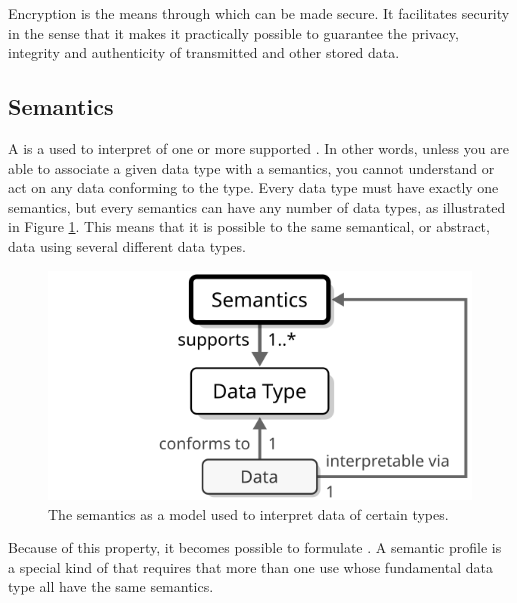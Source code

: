 Encryption is the means through which  can be made secure.
It facilitates security in the sense that it makes it practically possible to guarantee the privacy, integrity and authenticity of transmitted  and other stored data.

\newpage

\subsection{Semantics}
\label{sec:concepts:semantics}

A  is a  used to interpret  of one or more supported .
In other words, unless you are able to associate a given data type with a semantics, you cannot understand or act on any data conforming to the type.
Every data type must have exactly one semantics, but every semantics can have any number of data types, as illustrated in Figure \ref{fig:semantics}.
This means that it is possible to  the same semantical, or abstract, data using several different data types.

\begin{figure}[ht!]
  \centering
  \includegraphics[scale=0.9]{figures/semantics}
  \caption{
    The semantics as a model used to interpret data of certain types.
  }
  \label{fig:semantics}
\end{figure}

Because of this property, it becomes possible to formulate .
A semantic profile is a special kind of  that requires that more than one  use  whose fundamental data type all have the same semantics.